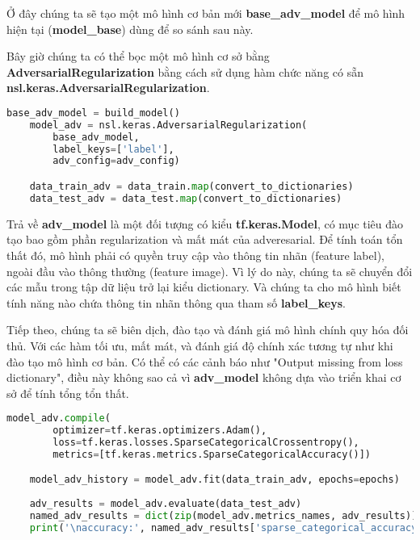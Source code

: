 Ở đây chúng ta sẽ tạo một mô hình cơ bản mới \textbf{base\_adv\_model} để mô hình hiện tại (\textbf{model\_base}) dùng để so sánh sau này.

Bây giờ chúng ta có thể bọc một mô hình cơ sở bằng \textbf{AdversarialRegularization} bằng cách sử dụng hàm chức năng
có sẵn \textbf{nsl.keras.AdversarialRegularization}.

\begin{lstlisting}[language=Python]
    base_adv_model = build_model()
    model_adv = nsl.keras.AdversarialRegularization(
        base_adv_model,
        label_keys=['label'],
        adv_config=adv_config)

    data_train_adv = data_train.map(convert_to_dictionaries)
    data_test_adv = data_test.map(convert_to_dictionaries)
\end{lstlisting}

Trả về \textbf{adv\_model} là một đối tượng có kiểu \textbf{tf.keras.Model}, có mục tiêu đào tạo bao gồm phần regularization và mất mát của adveresarial. Để tính toán tổn thất đó, mô hình phải có quyền truy cập 
vào thông tin nhãn (feature label), ngoài đầu vào thông thường (feature image). Vì lý do này, chúng ta sẽ chuyển đổi các mẫu trong tập dữ liệu trở lại kiểu dictionary. Và chúng ta cho mô 
hình biết tính năng nào chứa thông tin nhãn thông qua tham số \textbf{label\_keys}.

Tiếp theo, chúng ta sẽ biên dịch, đào tạo và đánh giá mô hình chính quy hóa đối thủ. Với các hàm tối ưu, mất mát, và đánh giá độ chính xác tương tự như khi đào tạo mô hình cơ bản.
Có thể có các cảnh báo như "Output missing from loss dictionary", điều này không sao cả vì \textbf{adv\_model} không dựa vào triển khai cơ sở để tính tổng tổn thất.



\begin{lstlisting}[language=Python]
    model_adv.compile(
        optimizer=tf.keras.optimizers.Adam(),
        loss=tf.keras.losses.SparseCategoricalCrossentropy(),
        metrics=[tf.keras.metrics.SparseCategoricalAccuracy()])

    model_adv_history = model_adv.fit(data_train_adv, epochs=epochs)
    
    adv_results = model_adv.evaluate(data_test_adv)
    named_adv_results = dict(zip(model_adv.metrics_names, adv_results))
    print('\naccuracy:', named_adv_results['sparse_categorical_accuracy'])

\end{lstlisting}

